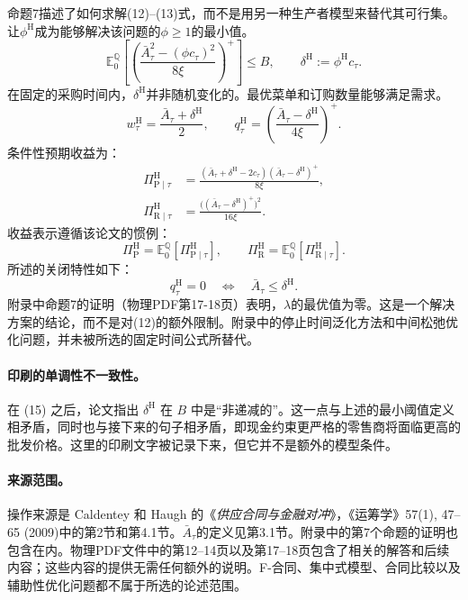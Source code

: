 \documentclass{article}
\begin{document}
命题7描述了如何求解(12)--(13)式，而不是用另一种生产者模型来替代其可行集。让$\phi^{\mathrm H}$成为能够解决该问题的$\phi\geqslant1$的最小值。
\[
\mathbb E_0^{\mathbb Q}\left[
\left(\frac{\bar A_\tau^2-(\phi c_\tau)^2}{8\xi}\right)^+
\right]\leqslant B,
\qquad
\delta^{\mathrm H}:=\phi^{\mathrm H}c_\tau.
\]
在固定的采购时间内，$\delta^{\mathrm H}$并非随机变化的。最优菜单和订购数量能够满足需求。
\begin{equation}
w_\tau^{\mathrm H}=\frac{\bar A_\tau+\delta^{\mathrm H}}{2},
\qquad
q_\tau^{\mathrm H}=
\left(\frac{\bar A_\tau-\delta^{\mathrm H}}{4\xi}\right)^+.
\tag{14}
\end{equation}
条件性预期收益为：
\begin{equation}
\begin{aligned}
\Pi_{\mathrm P\mid\tau}^{\mathrm H}
&=\frac{(\bar A_\tau+\delta^{\mathrm H}-2c_\tau)
(\bar A_\tau-\delta^{\mathrm H})^+}{8\xi},\\
\Pi_{\mathrm R\mid\tau}^{\mathrm H}
&=\frac{\big((\bar A_\tau-\delta^{\mathrm H})^+\big)^2}{16\xi}.
\end{aligned}
\tag{15}
\end{equation}
收益表示遵循该论文的惯例：
\[
\Pi_{\mathrm P}^{\mathrm H}
=\mathbb E_0^{\mathbb Q}[\Pi_{\mathrm P\mid\tau}^{\mathrm H}],
\qquad
\Pi_{\mathrm R}^{\mathrm H}
=\mathbb E_0^{\mathbb Q}[\Pi_{\mathrm R\mid\tau}^{\mathrm H}].
\]
所述的关闭特性如下：
\[
q_\tau^{\mathrm H}=0
\quad\Longleftrightarrow\quad
\bar A_\tau\leqslant\delta^{\mathrm H}.
\]
附录中命题7的证明（物理PDF第17-18页）表明，$\lambda$的最优值为零。这是一个解决方案的结论，而不是对(12)的额外限制。附录中的停止时间泛化方法和中间松弛优化问题，并未被所选的固定时间公式所替代。

\paragraph{印刷的单调性不一致性。}
在 (15) 之后，论文指出 $\delta^{\mathrm H}$ 在 $B$ 中是“非递减的”。这一点与上述的最小阈值定义相矛盾，同时也与接下来的句子相矛盾，即现金约束更严格的零售商将面临更高的批发价格。这里的印刷文字被记录下来，但它并不是额外的模型条件。

\paragraph{来源范围。}
操作来源是 Caldentey 和 Haugh 的《\emph{供应合同与金融对冲}》，《运筹学》57(1), 47--65 (2009)中的第2节和第4.1节。$\bar A_\tau$的定义见第3.1节。附录中的第7个命题的证明也包含在内。物理PDF文件中的第12--14页以及第17--18页包含了相关的解答和后续内容；这些内容的提供无需任何额外的说明。F-合同、集中式模型、合同比较以及辅助性优化问题都不属于所选的论述范围。
\end{document}
